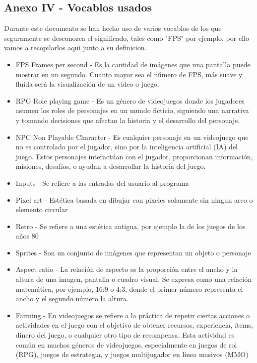\documentclass[a4paper]{article}
\begin{document}
\begin{appendices}
    \section{Anexo IV - Vocablos usados}
    Durante este documento se han hecho uso de varios vocablos de los que seguramente se desconozca el significado, tales como "FPS" por ejemplo, por ello vamos a recopilarlos aqui junto a su definicion.
    \begin{itemize}
        \item FPS Frames per second - Es la cantidad de imágenes que una pantalla puede mostrar en un segundo. Cuanto mayor sea el número de FPS, más suave y fluida será la visualización de un video o juego.
        \item RPG Role playing game - Es un género de videojuegos donde los jugadores asumen los roles de personajes en un mundo ficticio, siguiendo una narrativa y tomando decisiones que afectan la historia y el desarrollo del personaje.
        \item NPC Non Playable Character - Es cualquier personaje en un videojuego que no es controlado por el jugador, sino por la inteligencia artificial (IA) del juego. Estos personajes interactúan con el jugador, proporcionan información, misiones, desafíos, o ayudan a desarrollar la historia del juego.
        \item Inputs - Se refiere a las entradas del usuario al programa
        \item Pixel art - Estética basada en dibujar con pixeles solamente sin ningun arco o elemento circular
        \item Retro - Se refiere a una estética antigua, por ejemplo la de los juegos de los años 80
        \item Sprites - Son un conjunto de imágenes que representan un objeto o personaje
        \item Aspect ratio - La relación de aspecto es la proporción entre el ancho y la altura de una imagen, pantalla o cuadro visual. Se expresa como una relación matemática, por ejemplo, 16:9 o 4:3, donde el primer número representa el ancho y el segundo número la altura.
        \item Farming - En videojuegos se refiere a la práctica de repetir ciertas acciones o actividades en el juego con el objetivo de obtener recursos, experiencia, ítems, dinero del juego, o cualquier otro tipo de recompensa. Esta actividad es común en muchos géneros de videojuegos, especialmente en juegos de rol (RPG), juegos de estrategia, y juegos multijugador en línea masivos (MMO)
    \end{itemize}
    \clearpage

\end{appendices}
\end{document}
